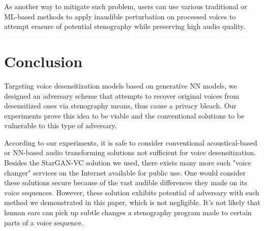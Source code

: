 \documentclass[journal]{IEEEtran} %
\begin{document}
As another way to mitigate such problem, users can use various traditional or ML-based methods to apply inaudible perturbation on processed voices to attempt erasure of potential stenography while preserving high audio quality.

\section{Conclusion}

Targeting voice desensitization models based on generative NN models, we designed an adversary scheme that attempts to recover original voices from desensitized ones via stenography means, thus cause a privacy bleach. Our experiments prove this idea to be viable and the conventional solutions to be vulnerable to this type of adversary.

According to our experiments, it is safe to consider conventional acoustical-based or NN-based audio transforming solutions not sufficient for voice desensitization. Besides the StarGAN-VC solution we used, there exists many more such "voice changer" services on the Internet available for public use. One would consider these solutions secure because of the vast audible differences they made on its voice sequences. However, these solution exhibits potential of adversary with such method we demonstrated in this paper, which is not negligible. It's not likely that human ears can pick up subtle changes a stenography program made to certain parts of a voice sequence.
\end{document}
